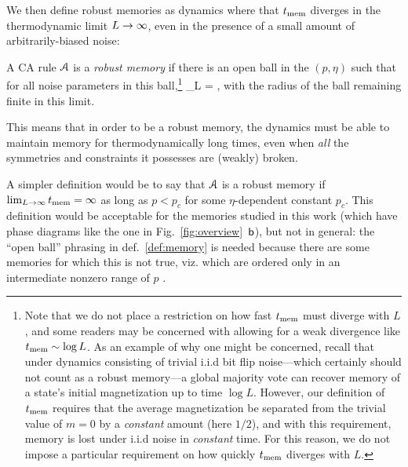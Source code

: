 \documentclass[pra,aps,twocolumn,groupedaddress,superscriptaddress,nofootinbib,preprintnumbers]{revtex4-2}
\begin{document}
	
	
	We then define robust memories as dynamics where that $t_{\rm mem}$ diverges in the thermodynamic limit $L\rightarrow\infty$, even in the presence of a small amount of arbitrarily-biased noise: 
	\begin{definition}\label{def:memory}
		A CA rule $\mathcal{A}$ is a {\it robust memory} if there is an open ball in the $(p,\eta)$  such that for all noise parameters in this ball,\footnote{Note that we do not place a restriction on how fast $t_{\rm mem}$ must diverge with $L$, and some readers may be concerned with allowing for a weak divergence like $t_{\rm mem} \sim \log L$. As an example of why one might be concerned, recall that under dynamics consisting of trivial i.i.d bit flip noise---which certainly should not count as a robust memory---a global majority vote can recover memory of a state's initial magnetization up to time $\log L$. However, our definition of $t_{\rm mem}$ requires that the average magnetization be separated from the trivial value of $m=0$ by a {\it constant} amount (here $1/2$), and with this requirement, memory is lost under i.i.d noise in {\it constant} time. For this reason, we do not impose a particular requirement on how quickly $t_{\rm mem}$ diverges with $L$.}
		\be \lim_{L\ra \infty} \tmem = \infty,\ee 
		with the radius of the ball remaining finite in this limit.
	\end{definition} 
    This means that in order to be a robust memory, the dynamics must be able to maintain memory for thermodynamically long times, even when {\it all} the symmetries and constraints it possesses are (weakly) broken. 
    
	A simpler definition would be to say that $\mathcal{A}$ is a robust memory if $\lim_{L\rightarrow\infty} t_{\rm mem} = \infty$ as long as $p<p_c$ for some $\eta$-dependent constant $p_c$. This definition would be acceptable for the memories studied in this work (which have phase diagrams like the one in Fig.~\ref{fig:overview}~$\mathsf{b}$), but not in general: the ``open ball'' phrasing in def.~\ref{def:memory} is needed because there are some memories for which this is not true, viz. which are ordered only in an intermediate nonzero range of $p$ \cite{pajouheshgar2025exploring,marsan2025perturbed}. 
	
\end{document}
